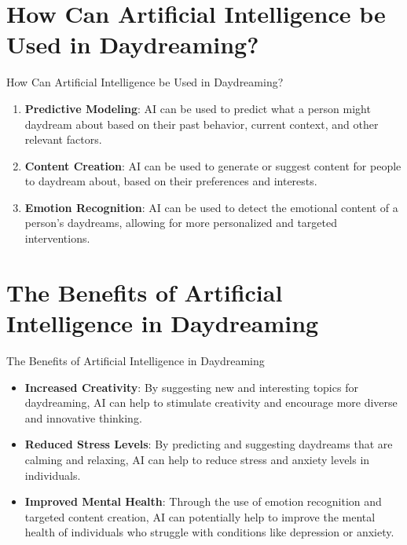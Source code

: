 \documentclass{beamer}
\begin{document}
\section{How Can Artificial Intelligence be Used in Daydreaming?}

\begin{frame}{How Can Artificial Intelligence be Used in Daydreaming?}
\begin{enumerate}
    \item \textbf{Predictive Modeling}: AI can be used to predict what a person might daydream about based on their past behavior, current context, and other relevant factors.
    \item \textbf{Content Creation}: AI can be used to generate or suggest content for people to daydream about, based on their preferences and interests.
    \item \textbf{Emotion Recognition}: AI can be used to detect the emotional content of a person's daydreams, allowing for more personalized and targeted interventions.
\end{enumerate}

\end{frame}

\section{The Benefits of Artificial Intelligence in Daydreaming}

\begin{frame}{The Benefits of Artificial Intelligence in Daydreaming}
\begin{itemize}
    \item \textbf{Increased Creativity}: By suggesting new and interesting topics for daydreaming, AI can help to stimulate creativity and encourage more diverse and innovative thinking.
    \item \textbf{Reduced Stress Levels}: By predicting and suggesting daydreams that are calming and relaxing, AI can help to reduce stress and anxiety levels in individuals.
    \item \textbf{Improved Mental Health}: Through the use of emotion recognition and targeted content creation, AI can potentially help to improve the mental health of individuals who struggle with conditions like depression or anxiety.
\end{itemize}
\end{frame}
\end{document}

